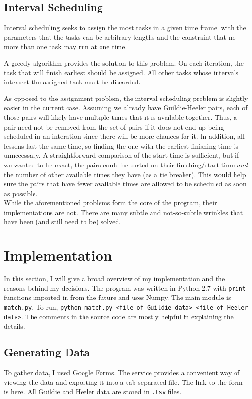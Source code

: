 \documentclass[letterpaper]{article}
\begin{document}
\subsection{Interval Scheduling}
Interval scheduling seeks to assign the most tasks in a given time frame, with the parameters that the tasks can be
arbitrary lengths and the constraint that no more than one task may run at one time.

A greedy algorithm provides the solution to this problem. On each iteration, the task that will finish earliest should
be assigned. All other tasks whose intervals intersect the assigned task must be discarded. 

As opposed to the assignment problem, the interval scheduling problem is slightly easier in the current case. Assuming we already
have Guildie-Heeler pairs, each of those pairs will likely have multiple times that it is available together. Thus, a pair
need not be removed from the set of pairs if it does not end up being scheduled in an interation since there will be
more chances for it. In addition, all lessons last the same time, so finding the one with the earliest finishing time is
unnecessary. A straightforward comparison of the start time is sufficient, but if we wanted to be exact, the pairs could
be sorted on their finishing/start time \textit{and} the number of other available times they have (as a tie breaker).
This would help sure the pairs that have fewer available times are allowed to be scheduled as soon as possible.\\

While the aforementioned problems form the core of the program, their implementations are not. There are many subtle and
not-so-subtle wrinkles that have been (and still need to be) solved.

\section{Implementation}
In this section, I will give a broad overview of my implementation and the reasons behind my decisions. The program was
written in Python 2.7 with \texttt{print} functions imported in from the future and uses Numpy. The main module is
\texttt{match.py}. To run, \texttt{python match.py <file of Guildie data> <file of Heeler data>}. The comments in the
source code are mostly helpful in explaining the details.

\subsection{Generating Data}
To gather data, I used Google Forms. The service provides a convenient way of viewing the data and exporting it into a
tab-separated file. The link to the form is
\href{https://docs.google.com/a/yale.edu/forms/d/1dGMb0QIPz002zcYsh-v1KmuDlbSm6i8hd1kqZ29O0LI/viewform?c=0&w=1}{here}.
All Guildie and Heeler data are stored in \texttt{.tsv} files.
\end{document}
